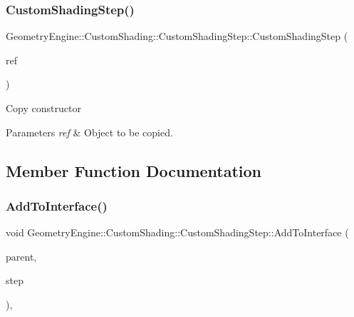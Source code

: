 \subsubsection{\texorpdfstring{CustomShadingStep()}{CustomShadingStep()}\hspace{0.1cm}{\footnotesize\ttfamily [2/2]}}
{\footnotesize\ttfamily Geometry\+Engine\+::\+Custom\+Shading\+::\+Custom\+Shading\+Step\+::\+Custom\+Shading\+Step (\begin{DoxyParamCaption}\item[{const \mbox{\hyperlink{class_geometry_engine_1_1_custom_shading_1_1_custom_shading_step}{Custom\+Shading\+Step}} \&}]{ref }\end{DoxyParamCaption})\hspace{0.3cm}{\ttfamily [inline]}}

Copy constructor 
\begin{DoxyParams}{Parameters}
{\em ref} & Object to be copied. \\
\hline
\end{DoxyParams}


\subsection{Member Function Documentation}
\mbox{\label{class_geometry_engine_1_1_custom_shading_1_1_custom_shading_step_a02cecdebc31b4f94406f7032ebbad5fc}} 
\subsubsection{\texorpdfstring{AddToInterface()}{AddToInterface()}}
{\footnotesize\ttfamily void Geometry\+Engine\+::\+Custom\+Shading\+::\+Custom\+Shading\+Step\+::\+Add\+To\+Interface (\begin{DoxyParamCaption}\item[{\mbox{\hyperlink{class_geometry_engine_1_1_custom_shading_1_1_custom_shading_interface}{Custom\+Shading\+Interface}} $\ast$}]{parent,  }\item[{\mbox{\hyperlink{namespace_geometry_engine_1_1_custom_shading_a2dc236a5b567da5099069ce2b2be5609}{Custom\+Shading\+Steps}}}]{step }\end{DoxyParamCaption})\hspace{0.3cm}{\ttfamily [protected]}, {\ttfamily [virtual]}}

